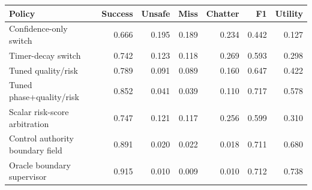 \begin{tabular}{lrrrrrr}
\toprule
Policy & Success & Unsafe & Miss & Chatter & F1 & Utility \\
\midrule
Confidence-only switch & 0.666 & 0.195 & 0.189 & 0.234 & 0.442 & 0.127 \\
Timer-decay switch & 0.742 & 0.123 & 0.118 & 0.269 & 0.593 & 0.298 \\
Tuned quality/risk & 0.789 & 0.091 & 0.089 & 0.160 & 0.647 & 0.422 \\
Tuned phase+quality/risk & 0.852 & 0.041 & 0.039 & 0.110 & 0.717 & 0.578 \\
Scalar risk-score arbitration & 0.747 & 0.121 & 0.117 & 0.256 & 0.599 & 0.310 \\
Control authority boundary field & 0.891 & 0.020 & 0.022 & 0.018 & 0.711 & 0.680 \\
Oracle boundary supervisor & 0.915 & 0.010 & 0.009 & 0.010 & 0.712 & 0.738 \\
\bottomrule
\end{tabular}
